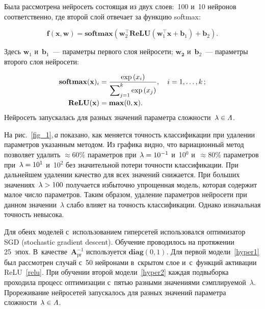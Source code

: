 \begin{multicols}{2}
Была рассмотрена нейросеть состоящая из двух слоев:~100 и~10 нейронов 
соответственно, где второй слой отвечает за функцию softmax:

\vspace*{2pt}

\noindent
$$
\mathbf{f}(\mathbf{x}, \mathbf{w})= \textbf{softmax}(\mathbf{w}_2^{\top}  
\mathbf{ReLU}(\mathbf{w}_1^{\top} \mathbf{x}  + \mathbf{b}_1) + \mathbf{b}_2).
$$

\vspace*{-2pt}

\noindent
Здесь $\mathbf{w}_1$ и~$\mathbf{b}_1$~--- параметры первого слоя нейросети;
 $\mathbf{w_2}$ и~$\mathbf{b}_2$~--- параметры второго слоя нейросети:
 
 \noindent
 \begin{align}
\textbf{softmax}(\mathbf{x})_i &= \displaystyle\frac{\displaystyle \exp{(x_i)}\mathstrut}{\displaystyle \sum\nolimits^{k}_{j = 1} 
\exp{(x_j)}\mathstrut}, \quad  i = 1, \dots, k\,; \notag
\\[-2pt]
\textbf{ReLU}(\mathbf{x}) &= \mathbf{max}(0, \mathbf{x}).
\label{relu}
\end{align}
Нейросеть запускалась для разных значений параметра сложности~$\lambda \hm\in 
\varLambda$.

\pagebreak

На рис.~\ref{fig_1},\,\textit{а} показано, как меняется точность классификации при 
удалении параметров указанным методом. Из графика видно, что вариационный метод 
позволяет удалить $ \approx 60\% $ параметров при~$\lambda \hm= 10^{-1}$ и~10$^0$ 
и~$\approx 80\%$ параметров при~$\lambda \hm= 10^1$ и~10$^2$ без значительной потери 
точности классификации. При дальнейшем удалении качество для всех значений 
снижается. При больших значениях~$\lambda\hm > 100$ получается избыточно упрощенная 
модель, которая содержит малое число параметров.  Таким образом, удаление 
параметров нейросети при данном значении~$\lambda$ слабо влияет на точность 
классификации. Однако изначальная точность невысока.

Для обеих моделей с~использованием гиперсетей использовался оптимизатор SGD
(stochastic gradient descent). 
Обучение проводилось на протяжении 25~эпох. В~качестве~$\mathbf{A}_{\mathrm{pr}}^{-1}$ 
используется $\mathbf{diag}({0,1})$. Для 
первой модели~\eqref{hyper1} был рассмотрен случай с~50 нейронами в~скрытом слое 
и~с~функций активации ReLU~\eqref{relu}. При обучении второй 
модели~\eqref{hyper2} каждая подвыборка проходила процесс оптимизации с~пятью 
разными значениями сэмп\-ли\-ру\-емой~$\lambda$. Прореживание нейросетей запускалось 
для разных значений па\-ра\-мет\-ра слож\-ности~$\lambda \hm\in \varLambda$.





\end{multicols}
